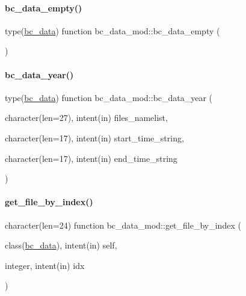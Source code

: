 \paragraph{\texorpdfstring{bc\+\_\+data\+\_\+empty()}{bc\_data\_empty()}}
{\footnotesize\ttfamily type(\mbox{\hyperlink{structbc__data__mod_1_1bc__data}{bc\+\_\+data}}) function bc\+\_\+data\+\_\+mod\+::bc\+\_\+data\+\_\+empty (\begin{DoxyParamCaption}{ }\end{DoxyParamCaption})\hspace{0.3cm}{\ttfamily [private]}}

\mbox{\label{namespacebc__data__mod_ae491b51c308e1f2d8077fbf42ab86b7d}} 
\paragraph{\texorpdfstring{bc\+\_\+data\+\_\+year()}{bc\_data\_year()}}
{\footnotesize\ttfamily type(\mbox{\hyperlink{structbc__data__mod_1_1bc__data}{bc\+\_\+data}}) function bc\+\_\+data\+\_\+mod\+::bc\+\_\+data\+\_\+year (\begin{DoxyParamCaption}\item[{character(len=27), intent(in)}]{files\+\_\+namelist,  }\item[{character(len=17), intent(in)}]{start\+\_\+time\+\_\+string,  }\item[{character(len=17), intent(in)}]{end\+\_\+time\+\_\+string }\end{DoxyParamCaption})\hspace{0.3cm}{\ttfamily [private]}}

\mbox{\label{namespacebc__data__mod_a5d07785bb1d93602c589990b9cf45d11}} 
\paragraph{\texorpdfstring{get\+\_\+file\+\_\+by\+\_\+index()}{get\_file\_by\_index()}}
{\footnotesize\ttfamily character(len=24) function bc\+\_\+data\+\_\+mod\+::get\+\_\+file\+\_\+by\+\_\+index (\begin{DoxyParamCaption}\item[{class(\mbox{\hyperlink{structbc__data__mod_1_1bc__data}{bc\+\_\+data}}), intent(in)}]{self,  }\item[{integer, intent(in)}]{idx }\end{DoxyParamCaption})\hspace{0.3cm}{\ttfamily [private]}}

